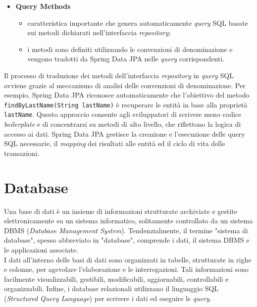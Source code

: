 \begin{itemize}
    \item \textbf{Query Methods}
    \begin{itemize}
        \item caratteristica importante che genera automaticamente \textit{query} SQL basate sui metodi dichiarati nell’interfaccia \textit{repository};
        \item i metodi sono definiti utilizzando le convenzioni di denominazione e vengono tradotti da Spring Data JPA nelle \textit{query} corrispondenti.\cite{SPRINGDATA_spring2}
    \end{itemize}

\end{itemize}
Il processo di traduzione dei metodi dell’interfaccia \textit{repository} in \textit{query} SQL avviene grazie al meccanismo di analisi delle convenzioni di denominazione.\cite{SPRINGDATA_spring2} Per esempio, Spring Data JPA riconosce automaticamente che l’obiettivo del metodo \texttt{findByLastName(String lastName)} è recuperare le entità in base alla proprietà \texttt{lastName}. Questo approccio consente agli sviluppatori di scrivere meno codice \textit{boilerplate} e di concentrarsi su metodi di alto livello, che riflettono la logica di accesso ai dati. Spring Data JPA gestisce la creazione e l’esecuzione delle query SQL necessarie, il \textit{mapping} dei risultati alle entità ed il ciclo di vita delle transazioni.

\section{Database}

Una base di dati è un insieme di informazioni strutturate archiviate e gestite elettronicamente su un sistema informatico, solitamente controllato da un sistema DBMS (\textit{Database Management System}). Tendenzialmente, il termine "sistema di database", spesso abbreviato in "database", comprende i dati, il sistema DBMS e le applicazioni associate.\cite{DATABASE_oracle}\\
I dati all’interno delle basi di dati sono organizzati in tabelle, strutturate in righe e colonne, per agevolare l’elaborazione e le interrogazioni. Tali informazioni sono facilmente visualizzabili, gestibili, modificabili, aggiornabili, controllabili e organizzabili. Infine, i database relazionali utilizzano il linguaggio SQL (\textit{Structured Query Language}) per scrivere i dati ed eseguire le \textit{query}.\cite{DATABASE_wikipedia}

